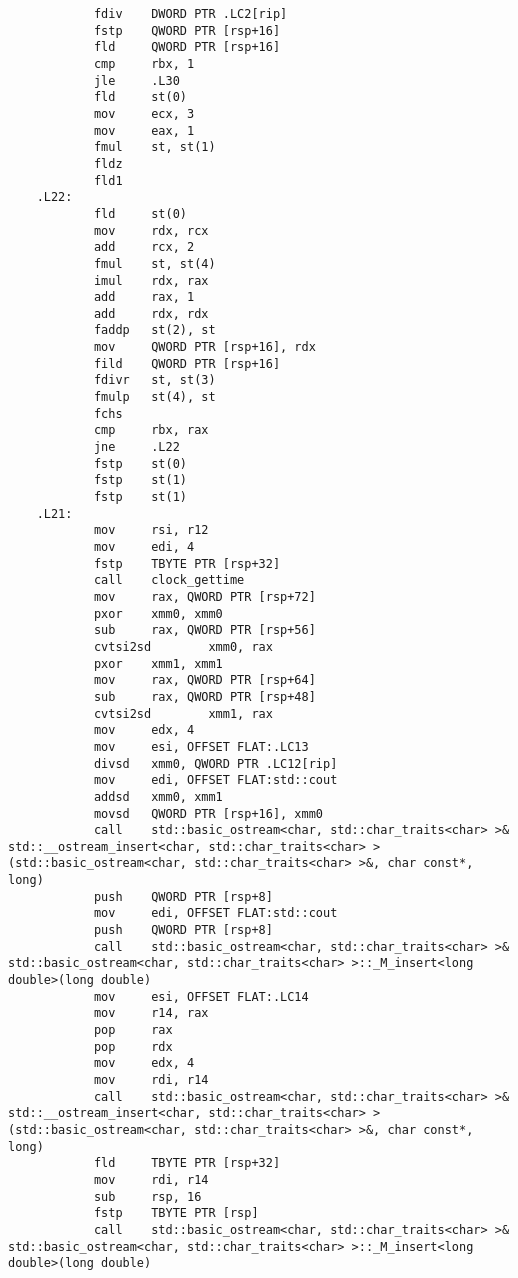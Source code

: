 \documentclass[12pt,a4paper]{article}
\numberwithin{subsection}{section}
\begin{document}
\begin{lstlisting}
            fdiv    DWORD PTR .LC2[rip]
            fstp    QWORD PTR [rsp+16]
            fld     QWORD PTR [rsp+16]
            cmp     rbx, 1
            jle     .L30
            fld     st(0)
            mov     ecx, 3
            mov     eax, 1
            fmul    st, st(1)
            fldz
            fld1
    .L22:
            fld     st(0)
            mov     rdx, rcx
            add     rcx, 2
            fmul    st, st(4)
            imul    rdx, rax
            add     rax, 1
            add     rdx, rdx
            faddp   st(2), st
            mov     QWORD PTR [rsp+16], rdx
            fild    QWORD PTR [rsp+16]
            fdivr   st, st(3)
            fmulp   st(4), st
            fchs
            cmp     rbx, rax
            jne     .L22
            fstp    st(0)
            fstp    st(1)
            fstp    st(1)
    .L21:
            mov     rsi, r12
            mov     edi, 4
            fstp    TBYTE PTR [rsp+32]
            call    clock_gettime
            mov     rax, QWORD PTR [rsp+72]
            pxor    xmm0, xmm0
            sub     rax, QWORD PTR [rsp+56]
            cvtsi2sd        xmm0, rax
            pxor    xmm1, xmm1
            mov     rax, QWORD PTR [rsp+64]
            sub     rax, QWORD PTR [rsp+48]
            cvtsi2sd        xmm1, rax
            mov     edx, 4
            mov     esi, OFFSET FLAT:.LC13
            divsd   xmm0, QWORD PTR .LC12[rip]
            mov     edi, OFFSET FLAT:std::cout
            addsd   xmm0, xmm1
            movsd   QWORD PTR [rsp+16], xmm0
            call    std::basic_ostream<char, std::char_traits<char> >& std::__ostream_insert<char, std::char_traits<char> >(std::basic_ostream<char, std::char_traits<char> >&, char const*, long)
            push    QWORD PTR [rsp+8]
            mov     edi, OFFSET FLAT:std::cout
            push    QWORD PTR [rsp+8]
            call    std::basic_ostream<char, std::char_traits<char> >& std::basic_ostream<char, std::char_traits<char> >::_M_insert<long double>(long double)
            mov     esi, OFFSET FLAT:.LC14
            mov     r14, rax
            pop     rax
            pop     rdx
            mov     edx, 4
            mov     rdi, r14
            call    std::basic_ostream<char, std::char_traits<char> >& std::__ostream_insert<char, std::char_traits<char> >(std::basic_ostream<char, std::char_traits<char> >&, char const*, long)
            fld     TBYTE PTR [rsp+32]
            mov     rdi, r14
            sub     rsp, 16
            fstp    TBYTE PTR [rsp]
            call    std::basic_ostream<char, std::char_traits<char> >& std::basic_ostream<char, std::char_traits<char> >::_M_insert<long double>(long double)

\end{lstlisting}
\end{document}
